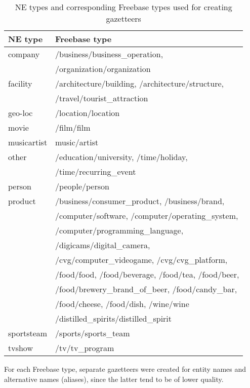 \documentclass[11pt|a4paper]{article}
\begin{document}
    \setlength{\tabcolsep}{1em}
    \begin{table}[t]
    \fontsize{8}{10}\selectfont
    \begin{center}
    \begin{tabular}{l l}
    \toprule
    \bf NE type & \bf Freebase type \\
    \hline
    company & /business/business\_operation, \\
     & /organization/organization \\
    facility & /architecture/building, /architecture/structure,  \\
     &  /travel/tourist\_attraction \\
    geo-loc &  /location/location \\
    movie & /film/film \\
    musicartist & music/artist \\
    other & /education/university, /time/holiday,  \\
     & /time/recurring\_event \\
    person & /people/person \\
    product &  /business/consumer\_product, /business/brand,\\
     & /computer/software, /computer/operating\_system,\\
     & /computer/programming\_language, \\
     & /digicams/digital\_camera,\\
     & /cvg/computer\_videogame,  /cvg/cvg\_platform,\\
     & /food/food, /food/beverage, /food/tea, /food/beer,\\
     & /food/brewery\_brand\_of\_beer, /food/candy\_bar,\\
     & /food/cheese, /food/dish, /wine/wine \\
     & /distilled\_spirits/distilled\_spirit \\
    
    sportsteam & /sports/sports\_team \\
    tvshow &  /tv/tv\_program \\
    \bottomrule
    \end{tabular}
    \end{center}
    \caption{\label{tab:ftypes} NE types and corresponding Freebase types used for creating gazetteers}
    \end{table}

\normalsize

For each Freebase type, separate gazetteers were created for entity names and alternative names (aliases), since the latter tend to be of lower quality.
\end{document}
